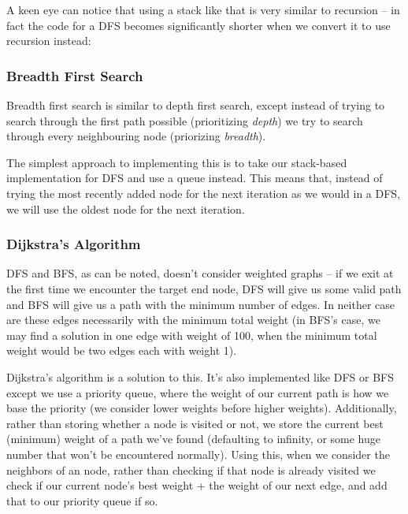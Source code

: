 
A keen eye can notice that using a stack like that is very similar to recursion -- in fact the code for a DFS becomes significantly shorter when we convert it to use recursion instead:


\subsubsection{Breadth First Search}

Breadth first search is similar to depth first search, except instead of trying to search through the first path possible (prioritizing \textit{depth}) we try to search through every neighbouring node (priorizing \textit{breadth}).

The simplest approach to implementing this is to take our stack-based implementation for DFS and use a queue instead. This means that, instead of trying the most recently added node for the next iteration as we would in a DFS, we will use the oldest node for the next iteration.

\subsubsection{Dijkstra's Algorithm}

DFS and BFS, as can be noted, doesn't consider weighted graphs -- if we exit at the first time we encounter the target end node, DFS will give us some valid path and BFS will give us a path with the minimum number of edges. In neither case are these edges necessarily with the minimum total weight (in BFS's case, we may find a solution in one edge with weight of 100, when the minimum total weight would be two edges each with weight 1).

Dijkstra's algorithm is a solution to this. It's also implemented like DFS or BFS except we use a priority queue, where the weight of our current path is how we base the priority (we consider lower weights before higher weights). Additionally, rather than storing whether a node is visited or not, we store the current best (minimum) weight of a path we've found (defaulting to infinity, or some huge number that won't be encountered normally). Using this, when we consider the neighbors of an node, rather than checking if that node is already visited we check if our current node's best weight + the weight of our next edge, and add that to our priority queue if so.

